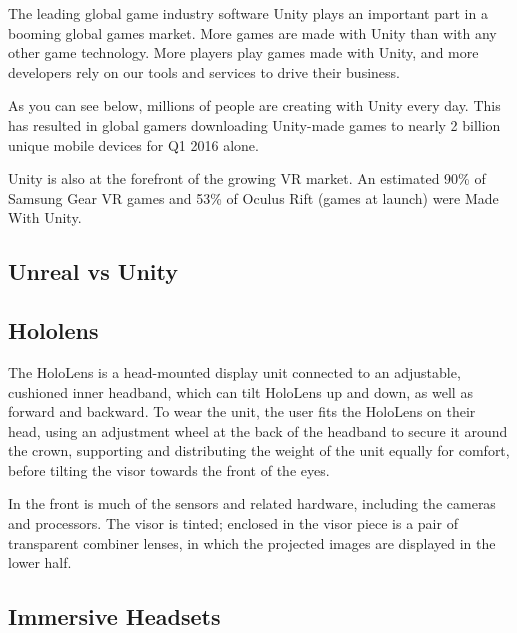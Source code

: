     The leading global game industry software
    Unity plays an important part in a booming global games market. More games are made with Unity than with any other game technology. More players play games made with Unity, and more developers rely on our tools and services to drive their business.
    
    As you can see below, millions of people are creating with Unity every day. This has resulted in global gamers downloading Unity-made games to nearly 2 billion unique mobile devices for Q1 2016 alone.
    
    Unity is also at the forefront of the growing VR market. An estimated 90\% of Samsung Gear VR games and 53\% of Oculus Rift (games at launch) were Made With Unity. %

    \subsection{Unreal vs Unity}

    \subsection{Hololens}
    The HoloLens is a head-mounted display unit connected to an adjustable, cushioned inner headband, which can tilt HoloLens up and down, as well as forward and backward. To wear the unit, the user fits the HoloLens on their head, using an adjustment wheel at the back of the headband to secure it around the crown, supporting and distributing the weight of the unit equally for comfort, before tilting the visor towards the front of the eyes.

    In the front is much of the sensors and related hardware, including the cameras and processors. The visor is tinted; enclosed in the visor piece is a pair of transparent combiner lenses, in which the projected images are displayed in the lower half. %

    \subsection{Immersive Headsets}
    
